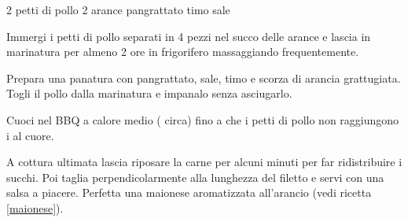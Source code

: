 \begin{ingreds}
	2 petti di pollo
	2 arance
	pangrattato
	timo
	sale

\end{ingreds}

\begin{method}
Immergi i petti di pollo separati in 4 pezzi nel succo delle arance e lascia in marinatura per almeno 2 ore in frigorifero massaggiando frequentemente.

Prepara una panatura con pangrattato, sale, timo e scorza di arancia grattugiata. Togli il pollo dalla marinatura e impanalo senza asciugarlo.

Cuoci nel BBQ a calore medio ( circa) fino a che i petti di pollo non raggiungono i  al cuore.

A cottura ultimata lascia riposare la carne per alcuni minuti per far ridistribuire i succhi. Poi taglia perpendicolarmente alla lunghezza del filetto e servi con una salsa a piacere. Perfetta una maionese aromatizzata all'arancio (vedi ricetta \ref{maionese}).


\end{method}



